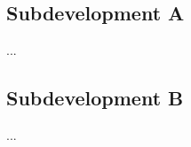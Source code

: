     \subsection{Subdevelopment A}
    
        ...
        
    \subsection{Subdevelopment B}
    
        ...

\newpage